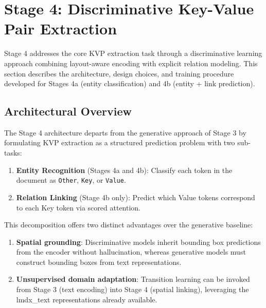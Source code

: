 % 

\section{Stage 4: Discriminative Key-Value Pair Extraction}
\label{sec:stage4_methodology}

Stage 4 addresses the core KVP extraction task through a discriminative learning approach combining layout-aware encoding with explicit relation modeling. This section describes the architecture, design choices, and training procedure developed for Stages 4a (entity classification) and 4b (entity + link prediction).

\subsection{Architectural Overview}
\label{sec:stage4_architecture}

The Stage 4 architecture departs from the generative approach of Stage 3 by formulating KVP extraction as a structured prediction problem with two sub-tasks:

\begin{enumerate}
    \item \textbf{Entity Recognition} (Stages 4a and 4b): Classify each token in the document as \texttt{Other}, \texttt{Key}, or \texttt{Value}.
    \item \textbf{Relation Linking} (Stage 4b only): Predict which Value tokens correspond to each Key token via scored attention.
\end{enumerate}

This decomposition offers two distinct advantages over the generative baseline:

\begin{enumerate}
    \item \textbf{Spatial grounding}: Discriminative models inherit bounding box predictions from the encoder without hallucination, whereas generative models must construct bounding boxes from text representations.
    \item \textbf{Unsupervised domain adaptation}: Transition learning can be invoked from Stage 3 (text encoding) into Stage 4 (spatial linking), leveraging the lmdx\_text representations already available.
\end{enumerate}

